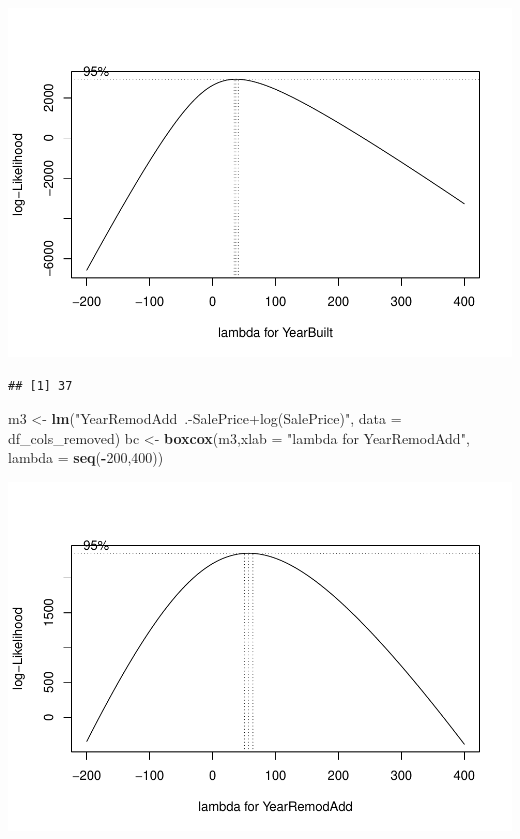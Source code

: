 \documentclass[
]{article}
\newenvironment{Shaded}{\begin{snugshade}}{\end{snugshade}}
\newcommand{\DataTypeTok}[1]{\textcolor[rgb]{0.13,0.29,0.53}{#1}}
\newcommand{\DecValTok}[1]{\textcolor[rgb]{0.00,0.00,0.81}{#1}}
\newcommand{\KeywordTok}[1]{\textcolor[rgb]{0.13,0.29,0.53}{\textbf{#1}}}
\newcommand{\NormalTok}[1]{#1}
\newcommand{\OperatorTok}[1]{\textcolor[rgb]{0.81,0.36,0.00}{\textbf{#1}}}
\newcommand{\StringTok}[1]{\textcolor[rgb]{0.31,0.60,0.02}{#1}}
\begin{document}
\includegraphics{Final-Project_files/figure-latex/unnamed-chunk-22-1.pdf}

\begin{Shaded}
\end{Shaded}

\begin{verbatim}
## [1] 37
\end{verbatim}

\begin{Shaded}
\begin{Highlighting}[]
\NormalTok{m3 <-}\StringTok{ }\KeywordTok{lm}\NormalTok{(}\StringTok{"YearRemodAdd~.-SalePrice+log(SalePrice)"}\NormalTok{, }\DataTypeTok{data =}\NormalTok{ df_cols_removed)}
\NormalTok{bc <-}\StringTok{ }\KeywordTok{boxcox}\NormalTok{(m3,}\DataTypeTok{xlab =} \StringTok{"lambda for YearRemodAdd"}\NormalTok{, }\DataTypeTok{lambda =} \KeywordTok{seq}\NormalTok{(}\OperatorTok{-}\DecValTok{200}\NormalTok{,}\DecValTok{400}\NormalTok{))}
\end{Highlighting}
\end{Shaded}

\includegraphics{Final-Project_files/figure-latex/unnamed-chunk-23-1.pdf}
\end{document}
